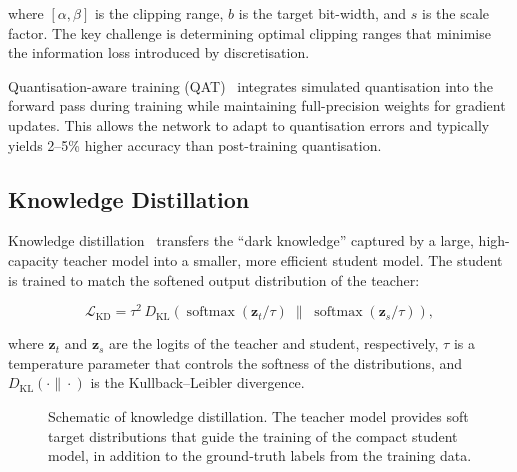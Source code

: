 where $[\alpha, \beta]$ is the clipping range, $b$ is the target
bit-width, and $s$ is the scale factor. The key challenge is determining
optimal clipping ranges that minimise the information loss introduced by
discretisation.

Quantisation-aware training (QAT)~\cite{kingma2014adam} integrates
simulated quantisation into the forward pass during training while
maintaining full-precision weights for gradient updates. This allows the
network to adapt to quantisation errors and typically yields 2--5\%
higher accuracy than post-training quantisation.

\subsection{Knowledge Distillation}

Knowledge distillation~\cite{goodfellow2016} transfers the
``dark knowledge'' captured by a large, high-capacity teacher model into
a smaller, more efficient student model. The student is trained to
match the softened output distribution of the teacher:

\begin{equation}
\mathcal{L}_{\text{KD}} =
\tau^2 \, D_{\text{KL}}\!\left(
\operatorname{softmax}(\mathbf{z}_t / \tau) \;\big\|\;
\operatorname{softmax}(\mathbf{z}_s / \tau)
\right),
\label{eq:distill}
\end{equation}

where $\mathbf{z}_t$ and $\mathbf{z}_s$ are the logits of the teacher
and student, respectively, $\tau$ is a temperature parameter that
controls the softness of the distributions, and
$D_{\text{KL}}(\cdot\|\cdot)$ is the Kullback--Leibler divergence.

\begin{figure}[htbp]
\centering
{}
\caption{Schematic of knowledge distillation. The teacher model provides
soft target distributions that guide the training of the compact student
model, in addition to the ground-truth labels from the training data.}
\label{fig:distillation}
\end{figure}
